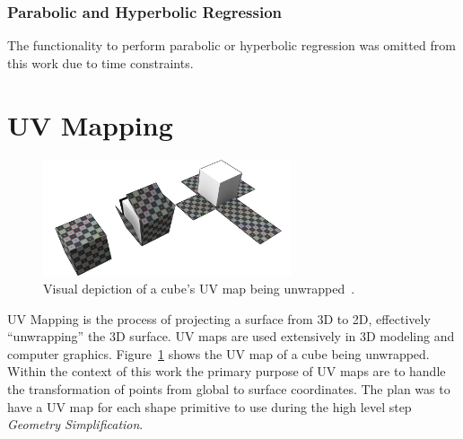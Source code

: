\subsubsection{Parabolic and Hyperbolic Regression}
The functionality to perform parabolic or hyperbolic regression was omitted from this work due to time constraints.


\section{UV Mapping}
\begin{figure}[htb]
	\centering
	\includegraphics[width=0.65\textwidth]{../resources/cube_UV_unwrapping.png}
	\caption{Visual depiction of a cube's UV map being unwrapped~\cite{UV_map_cube_img}.}
	\label{fig:uv_map_cube}
\end{figure}
UV Mapping is the process of projecting a surface from 3D to 2D, effectively ``unwrapping'' the 3D surface.
UV maps are used extensively in 3D modeling and computer graphics.
Figure~\ref{fig:uv_map_cube} shows the UV map of a cube being unwrapped.
Within the context of this work the primary purpose of UV maps are to handle the transformation of points from global to surface coordinates.
The plan was to have a UV map for each shape primitive to use during the high level step \textit{Geometry Simplification}.

